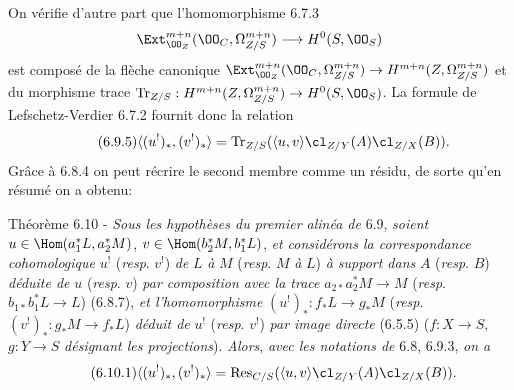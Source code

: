 On vérifie d'autre part que l'homomorphisme 6.7.3
\[
\Ext^{m+n}_{\OO_Z}(\OO_C,\Omega^{m+n}_{Z/S})\longrightarrow H^0(S,\OO_S)
\]
est composé de la flèche canonique $\Ext^{m+n}_{\OO_Z}(\OO_C,\Omega^{m+n}_{Z/S})\to H^{m+n}(Z,\Omega^{m+n}_{Z/S})$ et du morphisme trace $\operatorname{Tr}_{Z/S}:H^{m+n}(Z,\Omega^{m+n}_{Z/S})\to H^0(S,\OO_S)$. La formule de Lefschetz-Verdier 6.7.2 fournit donc la relation
\begin{equation}
\tag{6.9.5}
\langle (u^!)_*,(v^!)_*\rangle=\operatorname{Tr}_{Z/S}(\langle u,v\rangle\cl_{Z/Y}(A)\cl_{Z/X}(B)).
\end{equation}
Grâce à 6.8.4 on peut récrire le second membre comme un résidu, de sorte qu'en résumé on a obtenu:


\begin{statement}{Théorème 6.10 -}
\emph{Sous les hypothèses du premier alinéa de} 6.9, \emph{soient} $u\in\Hom(a_1^*L,a_2^*M)$, $v\in\Hom(b_2^*M,b_1^*L)$, \emph{et considérons la correspondance cohomologique} $u^!$ (\emph{resp}. $v^!$) \emph{de} $L$ \emph{à} $M$ (\emph{resp}. $M$ \emph{à} $L$) \emph{à support dans} $A$ (\emph{resp}. $B$) \emph{déduite de} $u$ (\emph{resp}. $v$) \emph{par composition avec la trace} $a_{2*}a_2^*M\to M$ (\emph{resp}. $b_{1*}b_1^*L\to L$) (6.8.7), \emph{et l'homomorphisme} $(u^!)_*:f_*L\to g_*M$ (\emph{resp}. $(v^!)_*:g_*M\to f_*L$) \emph{déduit de} $u^!$ (\emph{resp}. $v^!$) \emph{par image directe} (6.5.5) ($f:X\to S$, $g:Y\to S$
\emph{désignant les projections}). \emph{Alors}, \emph{avec les notations de} 6.8, 6.9.3, \emph{on a}
\begin{equation}
\tag{6.10.1}
\langle (u^!)_*,(v^!)_*\rangle=\operatorname{Res}_{C/S}(\langle u,v\rangle\cl_{Z/Y}(A)\cl_{Z/X}(B)).
\end{equation}
\end{statement}

